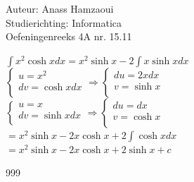 \documentclass[a4paper]{article}
\begin{document}
  
\noindent \large Auteur: Anass Hamzaoui \\
\noindent \large Studierichting: Informatica \\
\noindent \large Oefeningenreeks 4A nr. 15.11 \\

\medskip

\normalsize

$\displaystyle\int x^2 \cosh x  dx = x^2 \sinh x - 2 \displaystyle\int x \sinh x  dx$ \\

$\left\{
\begin{array}{l}
    u = x^2 \\
    dv = \cosh x  dx \\
\end{array}
\right. 
\Rightarrow
\left\{
\begin{array}{l}
    du = 2x  dx \\
    v = \sinh x \\
\end{array}
\right.$ \\

$\left\{
\begin{array}{l}
    u = x \\
    dv = \sinh x  dx \\
\end{array}
\right. 
\Rightarrow
\left\{
\begin{array}{l}
    du = dx \\
    v = \cosh x \\
\end{array}
\right.$ \\

$= x^2 \sinh x - 2x \cosh x + 2 \displaystyle\int \cosh x  dx$ \\

$= x^2 \sinh x - 2x \cosh x + 2 \sinh x + c$ \\

\begin{thebibliography}{999}
\end{thebibliography}
\end{document}

